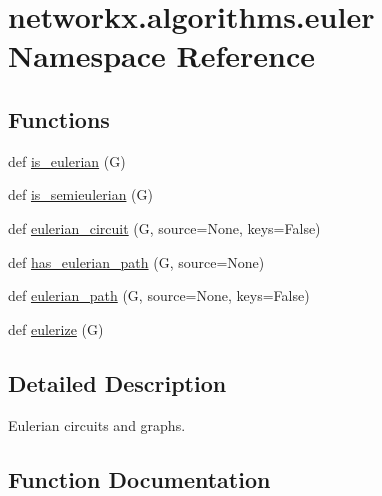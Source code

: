 \hypertarget{namespacenetworkx_1_1algorithms_1_1euler}{}\section{networkx.\+algorithms.\+euler Namespace Reference}
\label{namespacenetworkx_1_1algorithms_1_1euler}
\subsection*{Functions}
\begin{DoxyCompactItemize}
\item 
def \hyperlink{namespacenetworkx_1_1algorithms_1_1euler_ad3cd9baccb31ce1893b2ed9df72033be}{is\+\_\+eulerian} (G)
\item 
def \hyperlink{namespacenetworkx_1_1algorithms_1_1euler_ae4acc5b331c9f63351968abd4e2f3982}{is\+\_\+semieulerian} (G)
\item 
def \hyperlink{namespacenetworkx_1_1algorithms_1_1euler_af4523bde8f02a7923c58a34d67474b01}{eulerian\+\_\+circuit} (G, source=None, keys=False)
\item 
def \hyperlink{namespacenetworkx_1_1algorithms_1_1euler_a107eb2b6010025225995c8fa6cb75431}{has\+\_\+eulerian\+\_\+path} (G, source=None)
\item 
def \hyperlink{namespacenetworkx_1_1algorithms_1_1euler_a41ce6ad57053a6e8069ec6232960bfc3}{eulerian\+\_\+path} (G, source=None, keys=False)
\item 
def \hyperlink{namespacenetworkx_1_1algorithms_1_1euler_a32cbff4ddffb583be6a229c494940f02}{eulerize} (G)
\end{DoxyCompactItemize}


\subsection{Detailed Description}
\begin{DoxyVerb}Eulerian circuits and graphs.
\end{DoxyVerb}
 

\subsection{Function Documentation}
\mbox{\label{namespacenetworkx_1_1algorithms_1_1euler_af4523bde8f02a7923c58a34d67474b01}} 
